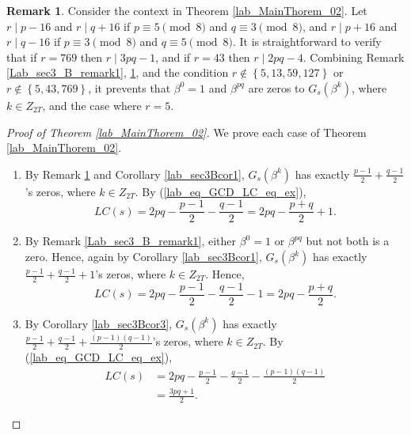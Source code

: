 \documentclass{mcom-l}
\theoremstyle{definition}
\newtheorem{sec3_B_remark2}[sec3_remark1]{Remark}
\numberwithin{equation}{section}
\begin{document}
      \begin{sec3_B_remark2}\label{Lab_sec3_B_remark2}
      Consider the context in Theorem \ref{lab_MainThorem_02}. Let $ r\mid p-16 $ and $ r\mid q+16 $ if $ p\equiv 5 \pmod 8 $ and $ q\equiv 3 \pmod 8 $, and $ r\mid p+16 $ and $ r\mid q-16 $ if $ p\equiv 3 \pmod 8 $ and $ q\equiv 5 \pmod 8 $. It is straightforward to verify that if $ r=769 $ then $ r\mid 3pq-1 $, and if $ r=43 $ then $ r\mid 2pq-4 $. Combining Remark \ref{Lab_sec3_B_remark1},  \ref{Lab_sec3_B_remark2}, and the condition  $ r\notin\left\lbrace 5,13,59,127\right\rbrace $ or $ r\notin\left\lbrace 5,43,769\right\rbrace $, it prevents that $ \beta^{0}=1 $ and $ \beta^{pq}$ are zeros to $ G_{s}(\beta^{k}) $, where $ k\in Z_{2T} $, and the case where $ r=5 $.
      \end{sec3_B_remark2}
      
      \begin{proof}[Proof of Theorem \ref{lab_MainThorem_02}]
      We prove each case of Theorem \ref{lab_MainThorem_02}.
      \begin{enumerate}
      \item By Remark \ref{Lab_sec3_B_remark2} and Corollary \ref{lab_sec3Bcor1}, $ G_{s}(\beta^{k}) $ has exactly $ \tfrac{p-1}{2}+\tfrac{q-1}{2} $'s zeros, where $ k\in Z_{2T} $. By (\ref{lab_eq_GCD_LC_eq_ex}), 
      \begin{equation*}
      LC(s)=2pq-\frac{p-1}{2}-\frac{q-1}{2}=2pq-\frac{p+q}{2}+1.
      \end{equation*}
      \item By Remark \ref{Lab_sec3_B_remark1}, either $ \beta^{0}=1 $ or $ \beta^{pq}$ but not both is a zero. Hence, again by Corollary \ref{lab_sec3Bcor1}, $ G_{s}(\beta^{k}) $ has exactly $ \tfrac{p-1}{2}+\tfrac{q-1}{2}+1 $'s zeros, where $ k\in Z_{2T} $. Hence,
      \begin{equation*}
      LC(s)=2pq-\frac{p-1}{2}-\frac{q-1}{2}-1=2pq-\frac{p+q}{2}.
      \end{equation*}
      \item By Corollary \ref{lab_sec3Bcor3}, $G_{s}(\beta^{k}) $ has exactly $ \tfrac{p-1}{2}+\tfrac{q-1}{2}+\tfrac{(p-1)(q-1)}{2}$'s zeros, where $ k\in Z_{2T} $. By (\ref{lab_eq_GCD_LC_eq_ex}), 
      \begin{equation*}
      \begin{split}
      LC(s)&=2pq-\frac{p-1}{2}-\frac{q-1}{2}-\frac{(p-1)(q-1)}{2}\\
           &=\frac{3pq+1}{2}.
      \end{split}
      \end{equation*}
      \end{enumerate}
      \end{proof}
    
\end{document}
